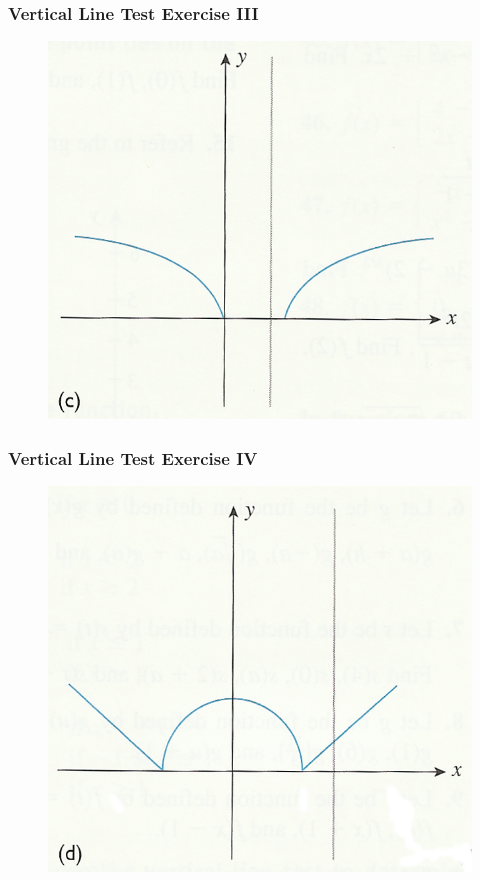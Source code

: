 \documentclass[xcolor=dvipsnames]{beamer}
\begin{document}
\begin{frame}
  \frametitle{Vertical Line Test Exercise III}
  \begin{figure}[h]
    \includegraphics[scale=1]{./vertical-03.png}
  \end{figure}
\end{frame}

\begin{frame}
  \frametitle{Vertical Line Test Exercise IV}
  \begin{figure}[h]
    \includegraphics[scale=1]{./vertical-04.png}
  \end{figure}
\end{frame}
\end{document}
